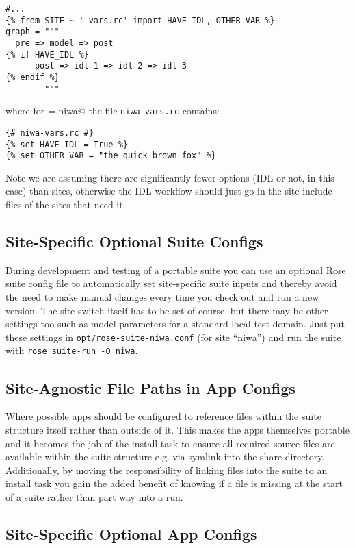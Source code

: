 \lstset{language=suiterc}
\begin{lstlisting}
#...
{% from SITE ~ '-vars.rc' import HAVE_IDL, OTHER_VAR %}
graph = """
  pre => model => post
{% if HAVE_IDL %}
      post => idl-1 => idl-2 => idl-3
{% endif %}
        """
\end{lstlisting}

where for \lstinline@SITE = niwa@ the file \lstinline=niwa-vars.rc= contains:
\lstset{language=suiterc}
\begin{lstlisting}
{# niwa-vars.rc #}
{% set HAVE_IDL = True %}
{% set OTHER_VAR = "the quick brown fox" %}
\end{lstlisting}

Note we are assuming there are significantly fewer options (IDL or not, in this
case) than sites, otherwise the IDL workflow should just go in the site
include-files of the sites that need it.

\subsection{Site-Specific Optional Suite Configs}

During development and testing of a portable suite you can use an optional Rose
suite config file to automatically set site-specific suite inputs and thereby
avoid the need to make manual changes every time you check out and run a new
version. The site switch itself has to be set of course, but there may be other
settings too such as model parameters for a standard local test domain. Just
put these settings in \lstinline=opt/rose-suite-niwa.conf= (for site ``niwa'')
and run the suite with \lstinline=rose suite-run -O niwa=.

\subsection{Site-Agnostic File Paths in App Configs}

Where possible apps should be configured to reference files within the suite
structure itself rather than outside of it. This makes the apps themselves
portable and it becomes the job of the install task to ensure all required
source files are available within the suite structure e.g. via symlink into
the share directory. Additionally, by moving the responsibility of linking
files into the suite to an install task you gain the added benefit of knowing
if a file is missing at the start of a suite rather than part way into a run.

\subsection{Site-Specific Optional App Configs}

